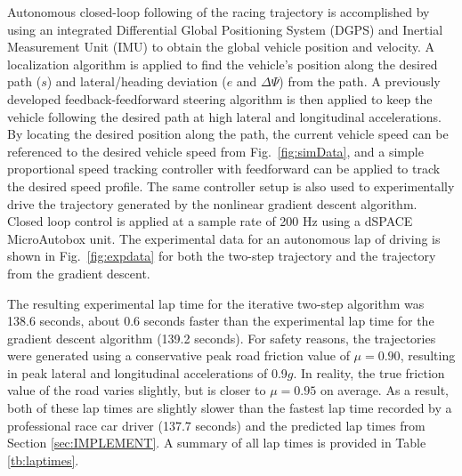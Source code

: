 \documentclass[twocolumn,10pt]{asme2ej}
\begin{document}
Autonomous closed-loop following of the racing trajectory is accomplished by using an integrated Differential Global Positioning System (DGPS) 
and Inertial Measurement Unit (IMU) to obtain the global vehicle position and velocity. A localization algorithm is applied to find the vehicle's position along the desired path ($s$) and lateral/heading deviation ($e$ and $\Delta\Psi$) from the path. A previously developed feedback-feedforward steering algorithm \cite{kapaniaVSD} 
is then applied to keep the vehicle following the desired path at high lateral and longitudinal accelerations. By locating the desired position along the path, the current vehicle speed can be referenced to the desired vehicle speed from Fig.~\ref{fig:simData}, 
and a simple proportional speed tracking controller with feedforward can be applied to track the desired speed profile. The same 
controller setup is also used to experimentally drive the trajectory generated by the nonlinear gradient descent algorithm. 
Closed loop control is applied at a sample rate of 200 Hz using a dSPACE MicroAutobox unit.  The experimental data 
for an autonomous lap of driving is shown in Fig.~\ref{fig:expdata} for both the two-step trajectory and the trajectory from the gradient descent. 

The resulting experimental lap time for the iterative two-step algorithm was 138.6 seconds, about 0.6 seconds faster
than the experimental lap time for the gradient descent algorithm (139.2 seconds). For safety reasons, the trajectories were generated using a conservative peak road friction value of $\mu = 0.90$,
 resulting in peak lateral and longitudinal accelerations of 0.9$g$. In reality, the true friction value of the road varies slightly, but is closer to $\mu = 0.95$ on average. As a
result, both of these lap times are slightly slower than the fastest lap time recorded by a professional race car driver (137.7 seconds) and the predicted lap times from Section \ref{sec:IMPLEMENT}. A summary of all lap times is provided in Table \ref{tb:laptimes}.
\end{document}
